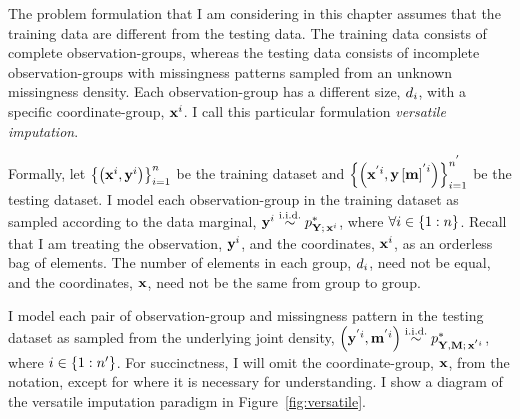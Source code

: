 \documentclass[../thesis.tex]{subfiles}
\begin{document}
The problem formulation that I am considering in this chapter assumes that the training data are different from the testing data. 
The training data consists of complete observation-groups, whereas the testing data consists of incomplete observation-groups with missingness patterns sampled from an unknown missingness density. Each observation-group has a different size, $d_i$, with a specific coordinate-group, $\mathbf{{x}}^i$. I call this particular formulation \textit{versatile imputation}.


Formally, let $\left\{ \left( \mathbf{{x}}^i, \mathbf{{y}}^i \right) \right\}_{i=1}^{n}$ be the training dataset and $\left\{ \left( \mathbf{{x}}^{'i}, \mathbf{{y}} \left[ \mathbf{{m}} \right]^{'i} \right) \right\}_{i=1}^{n^{'}}$ be the testing dataset. I model each observation-group in the training dataset as sampled according to the data marginal, $\mygroup{\myvect{y}}^i \overset{\mathrm{i.i.d.}}{\sim} \myfunc{p}^{*}_{\mygroup{\myrv{y}}; \, \mygroup{\myvect{x}}^i}$, where $\forall i \in \left\{ 1:n \right\}$. Recall that I am treating the observation, $\mathbf{{y}}^i$, and the coordinates, $\mathbf{{x}}^i$, as an orderless bag of elements. The number of elements in each group, $d_i$, need not be equal, and the coordinates, $\mathbf{{x}}$, need not be the same from group to group. 

I model each pair of observation-group and missingness pattern in the testing dataset as sampled from the underlying joint density, $\left( \mygroup{\myvect{y}}^{'i}, \mygroup{\myvect{m}}^{'i} \right) \overset{\mathrm{i.i.d.}}{\sim} \myfunc{p}^{*}_{\mygroup{\myrv{y}}, \mygroup{\myrv{m}}; \, \mygroup{\myvect{x}}^{'i}}$, where $i \in \left\{ 1:n' \right\}$. For succinctness, I will omit the coordinate-group, $\mathbf{{x}}$, from the notation, except for where it is necessary for understanding. I show a diagram of the versatile imputation paradigm in Figure~\ref{fig:versatile}. 
\end{document}
